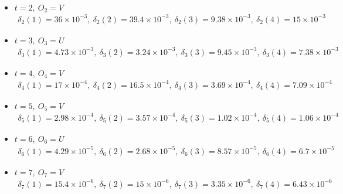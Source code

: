 \documentclass[12pt,a4paper]{article}
\begin{document}
				\begin{itemize}
					\item $t=2, ~ O_2=V$
					\begin{align*}
						\delta_2\left(1\right) = 36\times10^{-3}, ~
						\boxed{\delta_2\left(2\right) = 39.4\times10^{-3}}, ~
						\delta_2\left(3\right) = 9.38\times10^{-3}, ~
						\delta_2\left(4\right) = 15\times10^{-3}
					\end{align*}
					
					\item $t=3, ~ O_3=U$
					\begin{align*}
						\delta_3\left(1\right) = 4.73\times10^{-3}, ~
						\delta_3\left(2\right) = 3.24\times10^{-3}, ~
						\boxed{\delta_3\left(3\right) = 9.45\times10^{-3}}, ~
						\delta_3\left(4\right) = 7.38\times10^{-3}
					\end{align*}

					\item $t=4, ~ O_4=V$
					\begin{align*}
						\boxed{\delta_4\left(1\right) = 17\times10^{-4}}, ~
						\delta_4\left(2\right) = 16.5\times10^{-4}, ~
						\delta_4\left(3\right) = 3.69\times10^{-4}, ~
						\delta_4\left(4\right) = 7.09\times10^{-4}
					\end{align*}
					\item $t=5, ~ O_5=V$
					\begin{align*}
						\delta_5\left(1\right) = 2.98\times10^{-4}, ~
						\boxed{\delta_5\left(2\right) = 3.57\times10^{-4}}, ~
						\delta_5\left(3\right) = 1.02\times10^{-4}, ~
						\delta_5\left(4\right) = 1.06\times10^{-4}
					\end{align*}
					
					\item $t=6, ~ O_6=U$
					\begin{align*}
						\delta_6\left(1\right) = 4.29\times 10^{-5}, ~
						\delta_6\left(2\right) = 2.68\times 10^{-5}, ~
						\boxed{\delta_6\left(3\right) = 8.57\times 10^{-5}}, ~
						\delta_6\left(4\right) = 6.7\times 10^{-5}
					\end{align*}
					
					\item $t=7, ~ O_7=V$
					\begin{align*}
						\boxed{\delta_7\left(1\right) = 15.4\times10^{-6}}, ~
						\delta_7\left(2\right) = 15\times10^{-6}, ~
						\delta_7\left(3\right) = 3.35\times10^{-6}, ~
						\delta_7\left(4\right) = 6.43\times10^{-6}
					\end{align*}
					

\end{itemize}
\end{document}

